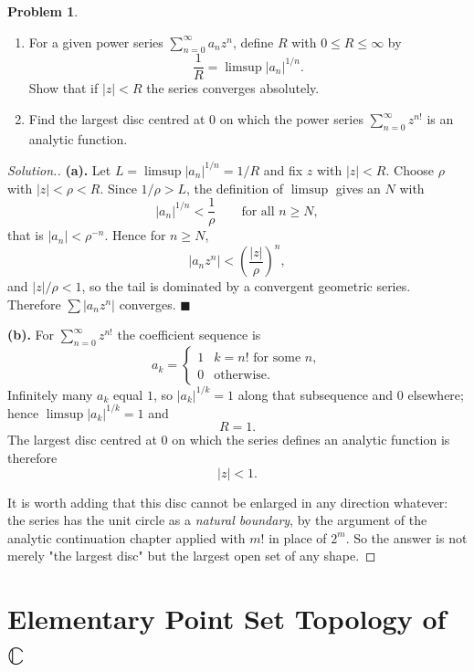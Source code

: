 \documentclass[11pt,a4paper]{article}
\theoremstyle{definition}
\newtheorem{problemx}{Problem}[section]
\newenvironment{problem}{\begin{problemx}}{\end{problemx}}
\newenvironment{solution}
  {\renewcommand{\qedsymbol}{}\begin{proof}[\textit{Solution}.]}
  {\end{proof}}
\begin{document}
\pagebreak

\begin{problem}
\begin{enumerate}
\item[(a).] For a given power series
$\displaystyle\sum^{\infty}_{n=0} a_n z^{n}$, define $R$ with
$0 \leq R \leq \infty$ by
$$\frac{1}{R} = \limsup\left|a_n\right|^{1/n}.$$
Show that if $\left|z\right| < R$ the series converges absolutely.
\item[(b).] Find the largest disc centred at $0$ on which the power series
$\displaystyle\sum^{\infty}_{n=0} z^{n!}$ is an analytic function.
\end{enumerate}
\end{problem}

\begin{solution}
\textbf{(a).} Let $L = \limsup\left|a_n\right|^{1/n} = 1/R$ and fix $z$ with
$\left|z\right| < R$. Choose $\rho$ with $\left|z\right| < \rho < R$. Since
$1/\rho > L$, the definition of $\limsup$ gives an $N$ with
$$\left|a_n\right|^{1/n} < \frac{1}{\rho}\qquad\text{for all } n \geq N,$$
that is $\left|a_n\right| < \rho^{-n}$. Hence for $n \geq N$,
$$\left|a_n z^{n}\right| < \left(\frac{\left|z\right|}{\rho}\right)^{n},$$
and $\left|z\right|/\rho < 1$, so the tail is dominated by a convergent geometric
series. Therefore $\sum\left|a_n z^n\right|$ converges. $\blacksquare$

\textbf{(b).} For $\displaystyle\sum^{\infty}_{n=0} z^{n!}$ the coefficient
sequence is
$$a_k = \begin{cases} 1 & k = n! \text{ for some } n,\\ 0 &\text{otherwise.}\end{cases}$$
Infinitely many $a_k$ equal $1$, so $\left|a_k\right|^{1/k} = 1$ along that
subsequence and $0$ elsewhere; hence $\limsup\left|a_k\right|^{1/k} = 1$ and
$$R = 1 .$$
The largest disc centred at $0$ on which the series defines an analytic function
is therefore
$$\boxed{\left|z\right| < 1 .}$$

It is worth adding that this disc cannot be enlarged in any direction whatever:
the series has the unit circle as a \emph{natural boundary}, by the argument of
the analytic continuation chapter applied with $m!$ in place of $2^m$. So the
answer is not merely "the largest disc" but the largest open set of any shape.
\end{solution}

\pagebreak
{\color[wave]{485}\section{Elementary Point Set Topology of $\mathbb{C}$}}
\end{document}
